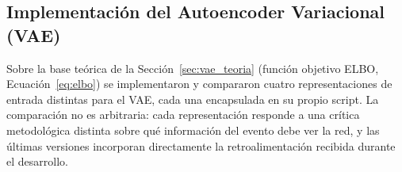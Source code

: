 \subsection{Implementación del Autoencoder Variacional (VAE)}
\label{sec:vae}

\noindent
Sobre la base teórica de la Sección~\ref{sec:vae_teoria} (función objetivo
ELBO, Ecuación~\ref{eq:elbo}) se implementaron y compararon cuatro
representaciones de entrada distintas para el VAE, cada una encapsulada en
su propio script. La comparación no es arbitraria: cada representación
responde a una crítica metodológica distinta sobre qué información del
evento debe ver la red, y las últimas versiones incorporan directamente la
retroalimentación recibida durante el desarrollo.

